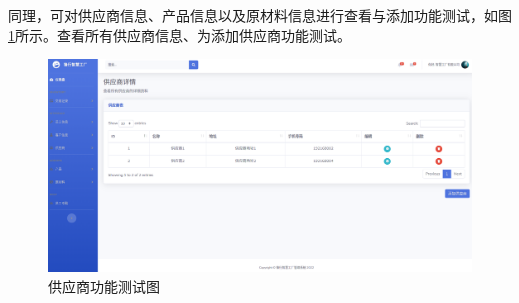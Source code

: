 同理，可对供应商信息、产品信息以及原材料信息进行查看与添加功能测试，如图\ref{fig:otstst}所示。查看所有供应商信息、为添加供应商功能测试。

\begin{figure}[H]
        \centering
        \includegraphics[width=.75\textwidth]{figures/6viewallsupplier.png}
    \caption{供应商功能测试图}
    \label{fig:otstst}
\end{figure}

